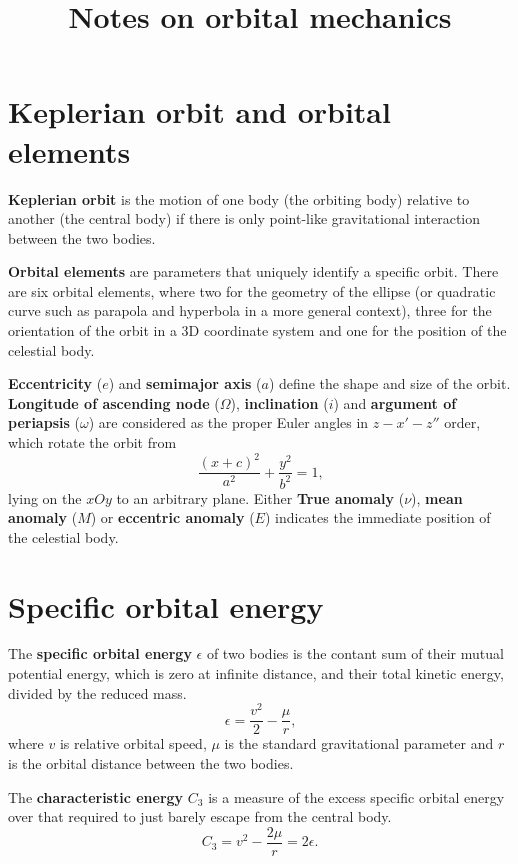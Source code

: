 \documentclass{article}
\begin{document}
\title{Notes on orbital mechanics}

\maketitle
\section{Keplerian orbit and orbital elements}
\textbf{Keplerian orbit} is the motion of one body (the orbiting body)
relative to another (the central body) if there is only
point-like gravitational interaction between the two bodies.

\textbf{Orbital elements} are parameters that uniquely identify a specific orbit. 
There are six orbital elements, where two for the geometry of the ellipse
(or quadratic curve such as parapola and hyperbola in a more general context),
three for the orientation of the orbit in a 3D coordinate system and one
for the position of the celestial body.

\textbf{Eccentricity} ($e$) and \textbf{semimajor axis} ($a$)
define the shape and size of the orbit.
\textbf{Longitude of ascending node} ($\Omega$),
\textbf{inclination} ($i$) and
\textbf{argument of periapsis} ($\omega$)
are considered as the proper Euler angles in $z-x'-z''$ order,
which rotate the orbit from
\begin{equation}
  \frac{(x+c)^2}{a^2} + \frac{y^2}{b^2} = 1\text{,}
  \label{equ:ellipse}
\end{equation}
lying on the $xOy$ to an arbitrary plane.
Either \textbf{True anomaly} ($\nu$), \textbf{mean anomaly} ($M$) or
\textbf{eccentric anomaly} ($E$) indicates the immediate position of
the celestial body.


\section{Specific orbital energy}
The \textbf{specific orbital energy} $\epsilon$ of two bodies is the contant
sum of their mutual potential energy, which is zero at infinite distance, and
their total kinetic energy, divided by the reduced mass.
\begin{equation}
  \epsilon = \frac{v^2}{2} - \frac{\mu}{r}\text{,}
\end{equation}
where $v$ is relative orbital speed, $\mu$ is the standard gravitational parameter
and $r$ is the orbital distance between the two bodies.

The \textbf{characteristic energy} $C_3$ is a measure of the excess specific orbital energy over
that required to just barely escape from the central body.
\begin{equation}
  C_3 = v^2 - \frac{2 \mu}{r} = 2 \epsilon\text{.}
\end{equation}
\end{document}
